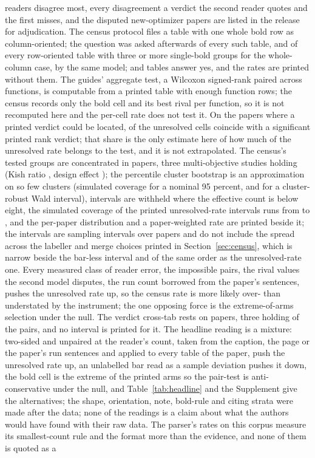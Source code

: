 \documentclass[preprint,review,12pt]{elsarticle}
\begin{document}
readers disagree most, every disagreement a verdict the second reader quotes and the first misses, and the \nTaMarkersNewOptimizerFirstNoSecondYes{} disputed new-optimizer papers are listed in the release for adjudication. The census protocol files a table with one whole bold row as column-oriented; the question was asked afterwards of every such table, and of every row-oriented table with three or more single-bold groups for the whole-column case, by the same model; \nCrcWholeRowTables{} and \nCrcWholeColTables{} tables answer yes, and the rates are printed without them. The guides' aggregate test, a Wilcoxon signed-rank paired across functions, is computable from a printed table with enough function rows; the census records only the bold cell and its best rival per function, so it is not recomputed here and the per-cell rate does not test it. On the \nVcPapersLocated{} papers where a printed verdict could be located, \nVcWelchFailPrintedSignificant{} of the \nVcWelchFailLocated{} unresolved cells coincide with a significant printed rank verdict; that share is the only estimate here of how much of the unresolved rate belongs to the test, and it is not extrapolated. The census's tested groups are concentrated in \nCrcPpPapers{} papers, three multi-objective studies holding \nCrcPpTopThreeShare{} (Kish ratio \nCrcPpEffectivePapers{}, design effect \nCrcPpDesignEffect{}); the percentile cluster bootstrap is an approximation on so few clusters (simulated coverage \nCrcPpBootCoverage{} for a nominal 95 percent, and \nCrcPpWaldCoverage{} for a cluster-robust Wald interval), intervals are withheld where the effective count is below eight, the simulated coverage of the printed unresolved-rate intervals runs from \nCrcCovMin{} to \nCrcCovMax{}, and the per-paper distribution and a paper-weighted rate are printed beside it; the intervals are sampling intervals over papers and do not include the spread across the labeller and merge choices printed in Section~\ref{sec:census}, which is narrow beside the bar-less interval and of the same order as the unresolved-rate one. Every measured class of reader error, the impossible pairs, the rival values the second model disputes, the run count borrowed from the paper's sentences, pushes the unresolved rate up, so the census rate is more likely over- than understated by the instrument; the one opposing force is the extreme-of-arms selection under the null. The verdict cross-tab rests on \nVcPapersLocated{} papers, three holding \nVcTopThreeShare{} of the pairs, and no interval is printed for it. The headline reading is a mixture: two-sided and unpaired at the reader's count, taken from the caption, the page or the paper's run sentences and applied to every table of the paper, push the unresolved rate up, an unlabelled bar read as a sample deviation pushes it down, the bold cell is the extreme of the printed arms so the pair-test is anti-conservative under the null, and Table~\ref{tab:headline} and the Supplement give the alternatives; the shape, orientation, note, bold-rule and citing strata were made after the data; none of the readings is a claim about what the authors would have found with their raw data. The parser's rates on this corpus measure its smallest-count rule and the format more than the evidence, and none of them is quoted as a 
\end{document}
